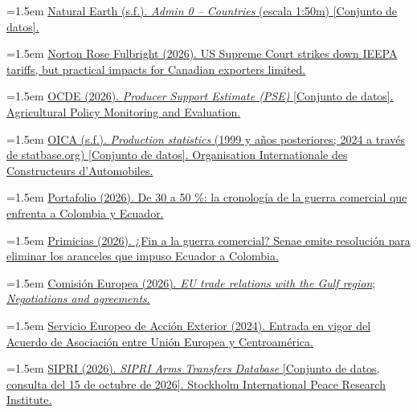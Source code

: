 \documentclass[10pt,a4paper]{article}
\begin{document}
\noindent\hangindent=1.5em \href{https://www.naturalearthdata.com}{Natural Earth (s.f.). \textit{Admin 0 -- Countries} (escala 1:50m) [Conjunto de datos].}

\noindent\hangindent=1.5em \href{https://www.nortonrosefulbright.com/en/knowledge/publications/99029733/us-supreme-court-strikes-down-ieepa-tariffs-but-practical-impacts-for-canadian-exporters-limited}{Norton Rose Fulbright (2026). US Supreme Court strikes down IEEPA tariffs, but practical impacts for Canadian exporters limited.}

\noindent\hangindent=1.5em \href{https://sdmx.oecd.org/public/rest/data/OECD.TAD.ARP,DSD_AGR_POLIND@DF_PSE,}{OCDE (2026). \textit{Producer Support Estimate (PSE)} [Conjunto de datos]. Agricultural Policy Monitoring and Evaluation.}

\noindent\hangindent=1.5em \href{https://www.oica.net/category/production-statistics/1999-statistics}{OICA (s.f.). \textit{Production statistics} (1999 y años posteriores; 2024 a través de statbase.org) [Conjunto de datos]. Organisation Internationale des Constructeurs d'Automobiles.}

\noindent\hangindent=1.5em \href{https://www.portafolio.co/negocios/comercio/de-30-a-50-la-cronologia-de-la-guerra-comercial-que-enfrenta-a-colombia-y-ecuador-489248}{Portafolio (2026). De 30 a 50 \%: la cronología de la guerra comercial que enfrenta a Colombia y Ecuador.}

\noindent\hangindent=1.5em \href{https://www.primicias.ec/economia/senae-aranceles-resolucion-elimina-tasa-ecuador-colombia-guerra-comercial-124207/}{Primicias (2026). ¿Fin a la guerra comercial? Senae emite resolución para eliminar los aranceles que impuso Ecuador a Colombia.}

\noindent\hangindent=1.5em \href{https://policy.trade.ec.europa.eu/eu-trade-relationships-country-and-region/countries-and-regions/gulf-region_en}{Comisión Europea (2026). \textit{EU trade relations with the Gulf region}}; \href{https://policy.trade.ec.europa.eu/eu-trade-relationships-country-and-region/negotiations-and-agreements_en}{\textit{Negotiations and agreements}.}

\noindent\hangindent=1.5em \href{https://www.eeas.europa.eu/node/441072_en}{Servicio Europeo de Acción Exterior (2024). Entrada en vigor del Acuerdo de Asociación entre Unión Europea y Centroamérica.}

\noindent\hangindent=1.5em \href{https://www.sipri.org/databases/armstransfers}{SIPRI (2026). \textit{SIPRI Arms Transfers Database} [Conjunto de datos, consulta del 15 de octubre de 2026]. Stockholm International Peace Research Institute.}
\end{document}
